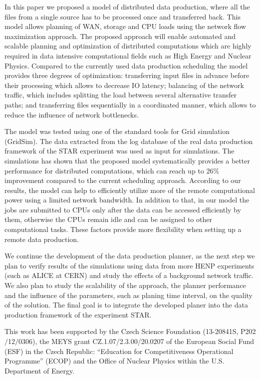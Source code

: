 \documentclass{svjour3}                     %
\begin{document}
In this paper we proposed a model of distributed data production, where all
the files from a single source has to be processed once and transferred back.
This model allows planning of WAN, storage and CPU loads using the network
flow maximization approach. The proposed approach will enable automated and scalable planning and optimization of distributed computations which are highly required in data intensive computational fields such as High Energy and Nuclear Physics. Compared to the currently used data production scheduling the model provides three degrees of optimization: transferring input files in advance before their processing which allows to decrease IO latency; balancing of the network traffic, which includes splitting the load between several alternative transfer paths; and transferring files sequentially in a coordinated manner, which allows to reduce the influence of network bottlenecks.

The model was tested using one of the standard tools for Grid simulation (GridSim). The data extracted from the log database of the real data production framework of the STAR experiment was used as input for simulations. The simulations has shown that the proposed model systematically provides a better performance for distributed computations, which can reach up to 26\% improvement compared to the current scheduling approach. According to our results, the model can help to efficiently utilize more of the remote computational power using a limited network bandwidth. In addition to that, in our model the jobs are submitted to CPUs only after the data can be accessed efficiently by them, otherwise the CPUs remain idle and can be assigned to other computational tasks. These factors provide more flexibility when setting up a remote data production.

We continue the development of the data production planner, as the next step we plan to verify results of the simulations using data from more HENP experiments (such as ALICE at CERN) and study the effects of a background network traffic. We also plan to study the scalability of the approach, the planner performance and the influence of the parameters, such as planing time interval, on the quality of the solution. The final goal is to integrate the developed planer into the data production framework of the experiment STAR.


\begin{acknowledgements}
This work has been supported by the Czech Science Foundation
(13-20841S, P202$/$12$/$0306),  the MEYS grant CZ.1.07/2.3.00/20.0207 of the European Social Fund (ESF) in the Czech Republic: “Education for Competitiveness Operational Programme” (ECOP) and the Office of Nuclear Physics within the U.S. Department of Energy.  
\end{acknowledgements}

{}

\end{document}

